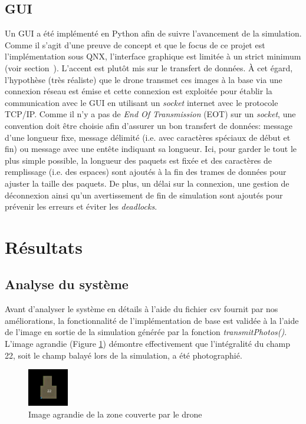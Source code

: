 \documentclass[journal]{IEEEtran}
\begin{document}
\subsection{GUI}
Un GUI a été implémenté en Python afin de suivre l'avancement de la simulation. Comme il s'agit d'une preuve de concept et que le focus de ce projet est l'implémentation sous QNX, l'interface graphique est limitée à un strict minimum (voir section~). L'accent est plutôt mis sur le transfert de données. À cet égard, l'hypothèse (très réaliste) que le drone transmet ces images à la base via une connexion réseau est émise et cette connexion est exploitée pour établir la communication avec le GUI en utilisant un \textit{socket} internet avec le protocole TCP/IP. Comme il n'y a pas de \textit{End Of Transmission} (EOT) sur un \textit{socket}, une convention doit être choisie afin d'assurer un bon transfert de données: message d'une longueur fixe, message délimité (i.e. avec caractères spéciaux de début et fin) ou  message avec une entête indiquant sa longueur. Ici, pour garder le tout le plus simple possible, la longueur des paquets est fixée et des caractères de remplissage (i.e. des espaces) sont ajoutés à la fin des trames de données pour ajuster la taille des paquets. De plus, un délai sur la connexion, une gestion de déconnexion ainsi qu'un avertissement de fin de simulation sont ajoutés pour prévenir les erreurs et éviter les \textit{deadlocks}.

\section{Résultats}\label{resultats}

\subsection{Analyse du système}
Avant d'analyser le système en détails à l'aide du fichier csv fournit par nos améliorations, la fonctionnalité de l'implémentation de base est validée à la l'aide de l'image en sortie de la simulation générée par la fonction \textit{transmitPhotos()}. L'image agrandie (Figure \ref{fig:farmMap}) démontre effectivement que l'intégralité du champ 22, soit le champ balayé lors de la simulation, a été photographié.

\begin{figure}
	\centering
	\captionsetup{justification=centering}
	\includegraphics[width=0.7in]{farmMap.png}
	\caption{Image agrandie de la zone couverte par le drone}
	\label{fig:farmMap}
\end{figure}
\end{document}
